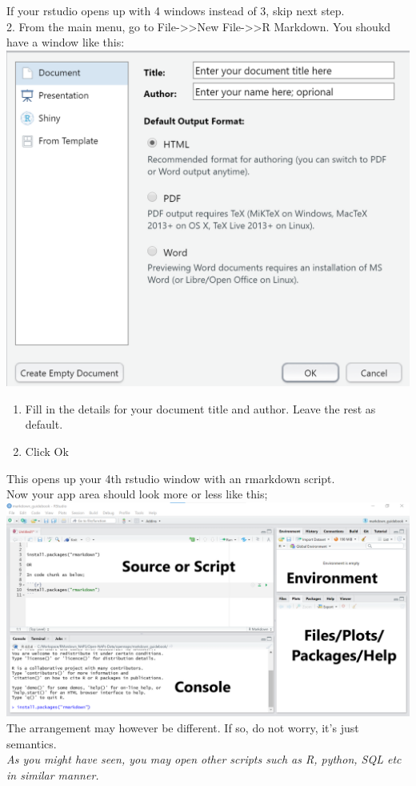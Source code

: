 \documentclass[
]{book}
\providecommand{\tightlist}{%
  \setlength{\itemsep}{0pt}\setlength{\parskip}{0pt}}
\begin{document}
If your rstudio opens up with 4 windows instead of 3, skip next step.\\
2. From the main menu, go to File-\textgreater\textgreater New File-\textgreater\textgreater R Markdown.
You shoukd have a window like this: \includegraphics{tutorial_screenshots/open_rmd_file.png}

\begin{enumerate}
\def\labelenumi{\arabic{enumi}.}
\setcounter{enumi}{2}
\tightlist
\item
  Fill in the details for your document title and author. Leave the rest as default.\\
\item
  Click Ok
\end{enumerate}

This opens up your 4th rstudio window with an rmarkdown script.\\
Now your app area should look more or less like this; \includegraphics{tutorial_screenshots/rstudio_panels_4.png}\\
The arrangement may however be different. If so, do not worry, it's just semantics.\\
\emph{As you might have seen, you may open other scripts such as R, python, SQL etc in similar manner.}
\end{document}
